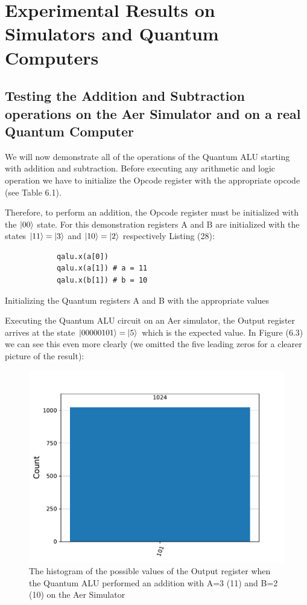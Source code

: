 \newpage
\section{Experimental Results on Simulators and Quantum Computers}
\subsection{Testing the Addition and Subtraction operations on the Aer Simulator and on a real Quantum Computer}

We will now demonstrate all of the operations of the Quantum ALU starting with addition and subtraction. Before executing any arithmetic and logic 
operation we have to initialize the Opcode register with the appropriate opcode (see Table 6.1).

Therefore, to perform an addition, the Opcode register must be initialized with the $\ket{00}$ state. For this demonstration
registers A and B are initialized with the states $\ket{11}=\ket{3}$ and $\ket{10}=\ket{2}$ respectively Listing (28):

\begin{listing}[!ht]
        \begin{verbatim}
            qalu.x(a[0])
            qalu.x(a[1]) # a = 11
            qalu.x(b[1]) # b = 10
        \end{verbatim}
        \caption{Initializing the Quantum registers A and B with the appropriate values}
        \label{ls:6_init_add}
\end{listing}

Executing the Quantum ALU circuit on an Aer simulator, the Output register arrives at the state $\ket{00000101}=\ket{5}$ which is the expected value.
In Figure (6.3) we can see this even more clearly (we omitted the five leading zeros for a clearer picture of the result):

\begin{figure}[!ht]
        \centering
        \includegraphics[scale=0.7]{images/6_Complete_System/adder_subtractor_aer_result.pdf}
        \caption{The histogram of the possible values of the Output register when the Quantum ALU performed an addition with A=3 (11) and B=2 (10) on the Aer Simulator}
\end{figure}

